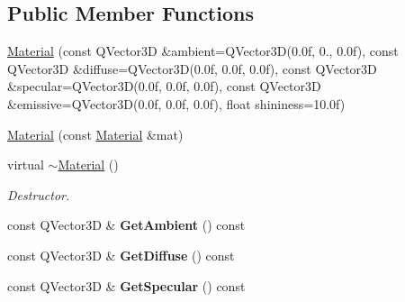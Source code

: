 \subsection*{Public Member Functions}
\begin{DoxyCompactItemize}
\item 
\mbox{\hyperlink{class_geometry_engine_1_1_geometry_material_1_1_material_aeae49a84f5f5b5e0c6ded1ba61e43f76}{Material}} (const Q\+Vector3D \&ambient=Q\+Vector3D(0.\+0f, 0., 0.\+0f), const Q\+Vector3\+D \&diffuse=\+Q\+Vector3\+D(0.\+0f, 0.\+0f, 0.\+0f), const Q\+Vector3\+D \&specular=\+Q\+Vector3\+D(0.\+0f, 0.\+0f, 0.\+0f), const Q\+Vector3\+D \&emissive=\+Q\+Vector3\+D(0.\+0f, 0.\+0f, 0.\+0f), float shininess=10.\+0f)
\item 
\mbox{\hyperlink{class_geometry_engine_1_1_geometry_material_1_1_material_a18c3bbd40d6c410c9c8ca9dfc36f15ee}{Material}} (const \mbox{\hyperlink{class_geometry_engine_1_1_geometry_material_1_1_material}{Material}} \&mat)
\item 
\mbox{\label{class_geometry_engine_1_1_geometry_material_1_1_material_a55a707060a08e18b45c7ea3f0ec64704}} 
virtual \mbox{\hyperlink{class_geometry_engine_1_1_geometry_material_1_1_material_a55a707060a08e18b45c7ea3f0ec64704}{$\sim$\+Material}} ()
\begin{DoxyCompactList}\small\item\em Destructor. \end{DoxyCompactList}\item 
\mbox{\label{class_geometry_engine_1_1_geometry_material_1_1_material_a6cb19eb225885da17e61405dcfe89a03}} 
const Q\+Vector3D \& {\bfseries Get\+Ambient} () const
\item 
\mbox{\label{class_geometry_engine_1_1_geometry_material_1_1_material_a5bbc1f5a1d5716e941135e74eec25206}} 
const Q\+Vector3D \& {\bfseries Get\+Diffuse} () const
\item 
\mbox{\label{class_geometry_engine_1_1_geometry_material_1_1_material_a978070bbc15e7d0b258c8ee7560eba13}} 
const Q\+Vector3D \& {\bfseries Get\+Specular} () const
\item 
\mbox{\label{class_geometry_engine_1_1_geometry_material_1_1_material_a86fc076373c6583f016022ccd56acf62}} 

\end{DoxyCompactItemize}
